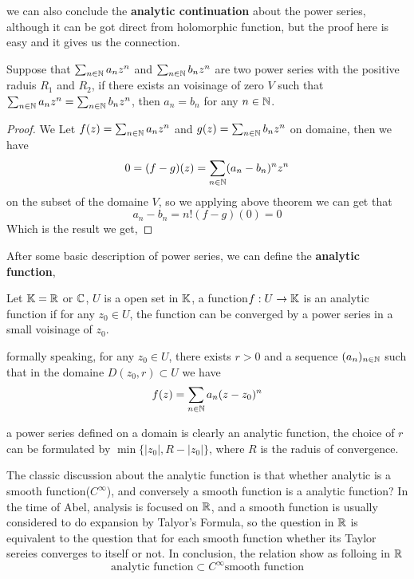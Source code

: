 \documentclass[en,geye,blue,normal,12pt,bibend=bibtex]{elegantnote}
\begin{document}
we can also conclude the \textbf{analytic continuation} about the power series, although it can be got direct from holomorphic function, but the proof here is easy and it gives us the connection.
\begin{corollary} \label{analytic continuity series}
    Suppose that \(\sum_{n \in \mathbb{N}}a_nz^n\) and  \(\sum_{n \in \mathbb{N}}b_nz^n\) are two power series with the positive raduis \(R_1\) and \(R_2\), if there exists an voisinage of zero \(V\) such that \(\sum_{n \in \mathbb{N}}a_nz^n = \sum_{n \in \mathbb{N}}b_nz^n\), then \(a_n = b_n\) for any \(n \in \mathbb{N}\). 

    \begin{proof}
        We Let \(f(z) = \sum_{n \in \mathbb{N}}a_nz^n\) and \(g(z) = \sum_{n \in \mathbb{N}}b_nz^n\) on domaine, then we have 
        \[0 = (f-g)(z) = \sum_{n \in \mathbb{N}} (a_n-b_n)^nz^n\]
        on the subset of the domaine \(V\), so we applying above theorem we can get that \[a_n-b_n = n!(f-g)(0) = 0\] Which is the result we get,
    \end{proof}
\end{corollary}

After some basic description of power series, we can define the \textbf{analytic function}, 
\begin{definition}
    Let \(\mathbb{K} = \mathbb{R}\) or \(\mathbb{C}\), \(U\) is a open set in \(\mathbb{K}\), a function\(f: U \to \mathbb{K}\) is an analytic function if for any \(z_0 \in U\), the function can be converged by a power series in a small voisinage of \(z_0\).

    formally speaking, for any \(z_0 \in U\), there exists \(r > 0\) and a sequence \((a_n)_{n \in \mathbb{N}}\) such that in the domaine \(D(z_0,r) \subset U\) we have
    \[f(z) = \sum_{n \in \mathbb{N}} a_n(z-z_0)^n\]
\end{definition}

\begin{remark}
    a power series defined on a domain is clearly an analytic function, the choice of \(r\) can be formulated by \(\min\{|z_0|,R-|z_0|\}\), where \(R\) is the raduis of convergence.
\end{remark}

The classic discussion about the analytic function is that whether  analytic is a smooth function(\(C^{\infty}\)), and conversely a smooth function is a analytic function? In the time of Abel, analysis is focused on \(\mathbb{R}\), and a smooth function is usually considered to do expansion by Talyor's Formula, so the question in \(\mathbb{R}\) is equivalent to the question that for each smooth function whether its Taylor sereies converges to itself or not. In conclusion, the relation show as folloing in \(\mathbb{R}\)
\[ \text{analytic function} \subset C^{\infty} \text{smooth function}\]
\end{document}
